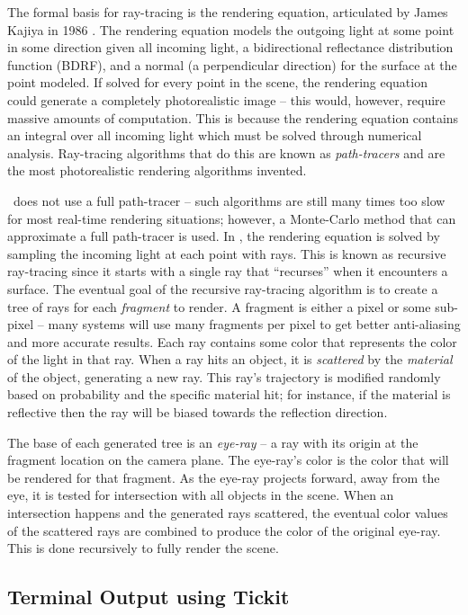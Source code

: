 The formal basis for ray-tracing is the rendering equation, articulated by James Kajiya in 1986 \cite{kajiya1986rendering}.
The rendering equation models the outgoing light at some point in some direction given all incoming light, a bidirectional reflectance distribution function (BDRF), and a normal (a perpendicular direction) for the surface at the point modeled.
If solved for every point in the scene, the rendering equation could generate a completely photorealistic image -- this would, however, require massive amounts of computation.
This is because the rendering equation contains an integral over all incoming light which must be solved through numerical analysis.
Ray-tracing algorithms that do this are known as {\it path-tracers} and are the most photorealistic rendering algorithms invented.

\name\ does not use a full path-tracer -- such algorithms are still many times too slow for most real-time rendering situations; however, a Monte-Carlo method that can approximate a full path-tracer is used.
In \name, the rendering equation is solved by sampling the incoming light at each point with rays.
This is known as recursive ray-tracing since it starts with a single ray that ``recurses'' when it encounters a surface.
The eventual goal of the recursive ray-tracing algorithm is to create a tree of rays for each {\it fragment} to render.
A fragment is either a pixel or some sub-pixel -- many systems will use many fragments per pixel to get better anti-aliasing and more accurate results.
Each ray contains some color that represents the color of the light in that ray.
When a ray hits an object, it is {\it scattered} by the {\it material} of the object, generating a new ray.
This ray's trajectory is modified randomly based on probability and the specific material hit; for instance, if the material is reflective then the ray will be biased towards the reflection direction.

The base of each generated tree is an {\it eye-ray} -- a ray with its origin at the fragment location on the camera plane.
The eye-ray's color is the color that will be rendered for that fragment.
As the eye-ray projects forward, away from the eye, it is tested for intersection with all objects in the scene.
When an intersection happens and the generated rays scattered, the eventual color values of the scattered rays are combined to produce the color of the original eye-ray.
This is done recursively to fully render the scene.

\subsection{Terminal Output using Tickit}
\label{ch:intro:overview:libtickit}

